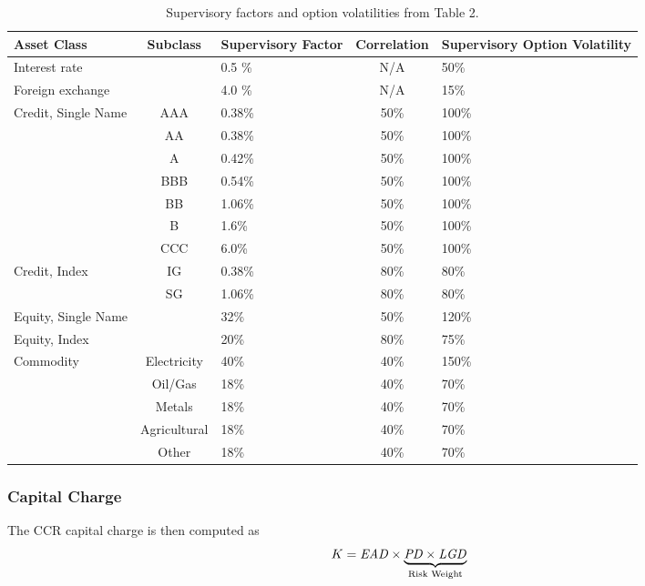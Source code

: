 {
\begin{table}[hbt]
\begin{center}
\scriptsize
\begin{tabular}{|l|c|p{1.5cm}|c|p{1.5cm}|}
\hline
Asset Class& Subclass & Supervisory Factor & Correlation &
Supervisory Option Volatility\\
\hline
\hline
Interest rate && 0.5 \% & N/A & 50\%\\
\hline
Foreign exchange && 4.0 \% & N/A & 15\%\\
\hline
Credit, Single Name & AAA & 0.38\% & 50\% & 100\%\\
\cline{2-5}
& AA & 0.38\% & 50\% & 100\%\\
\cline{2-5}
& A & 0.42\% & 50\% & 100\%\\
\cline{2-5}
& BBB & 0.54\% & 50\% & 100\%\\
\cline{2-5}
& BB & 1.06\% & 50\% & 100\%\\
\cline{2-5}
& B & 1.6\% & 50\% & 100\%\\
\cline{2-5}
& CCC & 6.0\% & 50\% & 100\%\\
\hline
Credit, Index & IG & 0.38\% & 80\% & 80\%\\
\cline{2-5}
& SG & 1.06\% & 80\% & 80\%\\
\hline
Equity, Single Name && 32\% & 50\% & 120\%\\
\hline
Equity, Index && 20\% & 80\% & 75\% \\
\hline
Commodity & Electricity & 40\% & 40\% & 150\%\\
\cline{2-5}
& Oil/Gas & 18\% & 40\% & 70\%\\
\cline{2-5}
& Metals & 18\% & 40\% & 70\%\\
\cline{2-5}
& Agricultural & 18\% & 40\% & 70\%\\
\cline{2-5}
& Other & 18\% & 40\% & 70\%\\
\hline
\end{tabular}\caption{Supervisory factors and option volatilities from \cite{bcbs279} Table 2.}\label{tab_saccr_vols}
\end{center}
\end{table}
}

\subsubsection{Capital Charge}\label{sssec_saccr_capital_charge}

The CCR capital charge is then computed as 
$$
K = \mathit{EAD} \times \underbrace{\mathit{PD} \times \mathit{LGD}}_{\text{Risk Weight}}
$$

